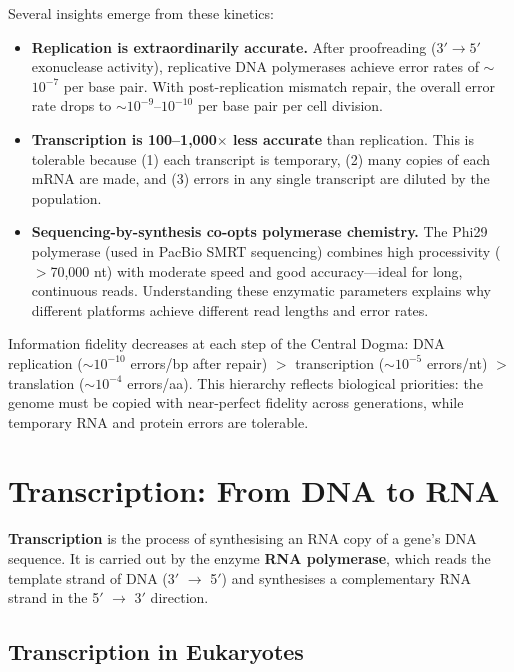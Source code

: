 Several insights emerge from these kinetics:

\begin{itemize}[itemsep=2pt]
  \item \textbf{Replication is extraordinarily accurate.} After proofreading ($3' \rightarrow 5'$ exonuclease activity), replicative DNA polymerases achieve error rates of $\sim$$10^{-7}$ per base pair. With post-replication mismatch repair, the overall error rate drops to $\sim$$10^{-9}$--$10^{-10}$ per base pair per cell division.
  \item \textbf{Transcription is 100--1,000$\times$ less accurate} than replication. This is tolerable because (1) each transcript is temporary, (2) many copies of each mRNA are made, and (3) errors in any single transcript are diluted by the population.
  \item \textbf{Sequencing-by-synthesis co-opts polymerase chemistry.} The Phi29 polymerase (used in PacBio SMRT sequencing) combines high processivity ($>$70,000 nt) with moderate speed and good accuracy---ideal for long, continuous reads. Understanding these enzymatic parameters explains why different platforms achieve different read lengths and error rates.
\end{itemize}

\begin{keyconcept}[title={Fidelity Hierarchy}]
Information fidelity decreases at each step of the Central Dogma: DNA replication ($\sim$$10^{-10}$ errors/bp after repair) $>$ transcription ($\sim$$10^{-5}$ errors/nt) $>$ translation ($\sim$$10^{-4}$ errors/aa). This hierarchy reflects biological priorities: the genome must be copied with near-perfect fidelity across generations, while temporary RNA and protein errors are tolerable.
\end{keyconcept}


\section{Transcription: From DNA to RNA}
\label{sec:molbio:transcription}

\textbf{Transcription} is the process of synthesising an RNA copy of a gene's DNA sequence. It is carried out by the enzyme \textbf{RNA polymerase}, which reads the template strand of DNA (3$'${} $\rightarrow$ 5$'${}) and synthesises a complementary RNA strand in the 5$'${} $\rightarrow$ 3$'${} direction.

\subsection{Transcription in Eukaryotes}
\label{subsec:molbio:euk-transcription}

